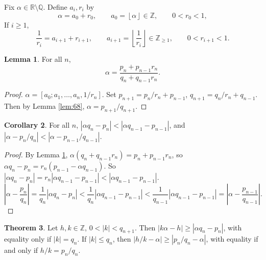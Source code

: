 \documentclass{article}
\newcommand{\Z}{\mathbb{Z}}
\newcommand{\Q}{\mathbb{Q}}
\newcommand{\R}{\mathbb{R}}
\newcommand{\rb}[1]{\left( #1 \right)}
\renewcommand{\sb}[1]{\left[ #1 \right]}
\newcommand{\abs}[1]{\left\lvert #1 \right\rvert}
\newcommand{\fb}[1]{\left\lfloor #1 \right\rfloor}
\theoremstyle{definition}\newtheorem{definition}{Definition}
\theoremstyle{definition}\newtheorem{remark}[definition]{Remark}
\theoremstyle{definition}\newtheorem*{example}{Example}
\theoremstyle{definition}\newtheorem*{note}{Note}
\newtheorem{lemma}[definition]{Lemma}
\newtheorem{theorem}[definition]{Theorem}
\newtheorem{corollary}[definition]{Corollary}
\begin{document}
Fix $ \alpha \in \R \setminus \Q $. Define $ a_i, r_i $ by
$$ \alpha = a_0 + r_0, \qquad a_0 = \fb{\alpha} \in \Z, \qquad 0 < r_0 < 1, $$
If $ i \ge 1 $,
$$ \dfrac{1}{r_i} = a_{i + 1} + r_{i + 1}, \qquad a_{i + 1} = \fb{\dfrac{1}{r_i}} \in \Z_{\ge 1}, \qquad 0 < r_{i + 1} < 1. $$

\begin{lemma}
\label{lem:72}
For all $ n $,
$$ \alpha = \dfrac{p_n + p_{n - 1}r_n}{q_n + q_{n - 1}r_n}. $$
\end{lemma}

\begin{proof}
$ \alpha = \sb{a_0; a_1, \dots, a_n, 1 / r_n} $. Set $ p_{n + 1} = p_n / r_n + p_{n - 1} $, $ q_{n + 1} = q_n / r_n + q_{n - 1} $. Then by Lemma \ref{lem:68}, $ \alpha = p_{n + 1} / q_{n + 1} $.
\end{proof}

\begin{corollary}
For all $ n $, $ \abs{\alpha q_n - p_n} < \abs{\alpha q_{n - 1} - p_{n - 1}} $, and $ \abs{\alpha - p_n / q_n} < \abs{\alpha - p_{n - 1} / q_{n - 1}} $.
\end{corollary}

\begin{proof}
By Lemma \ref{lem:72}, $ \alpha\rb{q_n + q_{n - 1}r_n} = p_n + p_{n - 1}r_n $, so $ \alpha q_n - p_n = r_n\rb{p_{n - 1} - \alpha q_{n - 1}} $. So $ \abs{\alpha q_n - p_n} = r_n\abs{\alpha q_{n - 1} - p_{n - 1}} < \abs{\alpha q_{n - 1} - p_{n - 1}} $.
$$ \abs{\alpha - \dfrac{p_n}{q_n}} = \dfrac{1}{q_n}\abs{\alpha q_n - p_n} < \dfrac{1}{q_n}\abs{\alpha q_{n - 1} - p_{n - 1}} < \dfrac{1}{q_{n - 1}}\abs{\alpha q_{n - 1} - p_{n - 1}} = \abs{\alpha - \dfrac{p_{n - 1}}{q_{n - 1}}}. $$
\end{proof}

\begin{theorem}
\label{thm:74}
Let $ h, k \in \Z $, $ 0 < \abs{k} < q_{n + 1} $. Then $ \abs{k\alpha - h} \ge \abs{\alpha q_n - p_n} $, with equality only if $ \abs{k} = q_n $. If $ \abs{k} \le q_n $, then $ \abs{h / k - \alpha} \ge \abs{p_n / q_n - \alpha} $, with equality if and only if $ h / k = p_n / q_n $.
\end{theorem}
\end{document}
